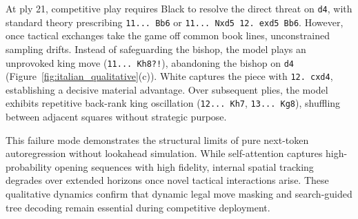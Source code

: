 At ply 21, competitive play requires Black to resolve the direct threat on \texttt{d4}, with standard theory prescribing \texttt{11... Bb6} or \texttt{11... Nxd5 12. exd5 Bb6}. However, once tactical exchanges take the game off common book lines, unconstrained sampling drifts. Instead of safeguarding the bishop, the model plays an unprovoked king move (\texttt{11... Kh8?!}), abandoning the bishop on \texttt{d4} (Figure~\ref{fig:italian_qualitative}(c)). White captures the piece with \texttt{12. cxd4}, establishing a decisive material advantage. Over subsequent plies, the model exhibits repetitive back-rank king oscillation (\texttt{12... Kh7}, \texttt{13... Kg8}), shuffling between adjacent squares without strategic purpose.

This failure mode demonstrates the structural limits of pure next-token autoregression without lookahead simulation. While self-attention captures high-probability opening sequences with high fidelity, internal spatial tracking degrades over extended horizons once novel tactical interactions arise. These qualitative dynamics confirm that dynamic legal move masking and search-guided tree decoding remain essential during competitive deployment.
